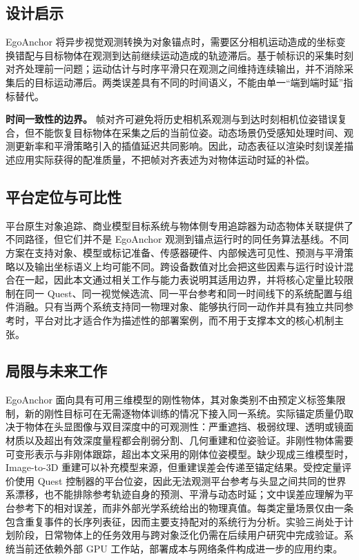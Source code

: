 \documentclass[review]{vgtc}
\begin{document}
\subsection{设计启示}


EgoAnchor 将异步视觉观测转换为对象锚点时，需要区分相机运动造成的坐标变换错配与目标物体在观测到达前继续运动造成的轨迹滞后。基于帧标识的采集时刻对齐处理前一问题；运动估计与时序平滑只在观测之间维持连续输出，并不消除采集后的目标运动滞后。两类误差具有不同的时间语义，不能由单一“端到端时延”指标替代。

\textbf{时间一致性的边界。} 帧对齐可避免将历史相机系观测与到达时刻相机位姿错误复合，但不能恢复目标物体在采集之后的当前位姿。动态场景仍受感知处理时间、观测更新率和平滑策略引入的插值延迟共同影响。因此，动态表征以渲染时刻误差描述应用实际获得的配准质量，不把帧对齐表述为对物体运动时延的补偿。

\subsection{平台定位与可比性}

平台原生对象追踪、商业模型目标系统与物体侧专用追踪器为动态物体关联提供了不同路径，但它们并不是 EgoAnchor 观测到锚点运行时的同任务算法基线。不同方案在支持对象、模型或标记准备、传感器硬件、内部候选可见性、预测与平滑策略以及输出坐标语义上均可能不同。跨设备数值对比会把这些因素与运行时设计混合在一起，因此本文通过相关工作与能力表说明其适用边界，并将核心定量比较限制在同一 Quest、同一视觉候选流、同一平台参考和同一时间线下的系统配置与组件消融。只有当两个系统支持同一物理对象、能够执行同一动作并具有独立共同参考时，平台对比才适合作为描述性的部署案例，而不用于支撑本文的核心机制主张。

\subsection{局限与未来工作}


EgoAnchor 面向具有可用三维模型的刚性物体，其对象类别不由预定义标签集限制，新的刚性目标可在无需逐物体训练的情况下接入同一系统。实际锚定质量仍取决于物体在头显图像与双目深度中的可观测性：严重遮挡、极弱纹理、透明或镜面材质以及超出有效深度量程都会削弱分割、几何重建和位姿验证。非刚性物体需要可变形表示与非刚体跟踪，超出本文采用的刚体位姿模型。缺少现成三维模型时，Image-to-3D 重建可以补充模型来源，但重建误差会传递至锚定结果。受控定量评价使用 Quest 控制器的平台位姿，因此无法观测平台参考与头显之间共同的世界系漂移，也不能排除参考轨迹自身的预测、平滑与动态时延；文中误差应理解为平台参考下的相对误差，而非外部光学系统给出的物理真值。每类定量场景仅由一条包含重复事件的长序列表征，因而主要支持配对的系统行为分析。实验三尚处于计划阶段，日常物体上的任务效用与跨对象泛化仍需在后续用户研究中完成验证。系统当前还依赖外部 GPU 工作站，部署成本与网络条件构成进一步的应用约束。
\end{document}
